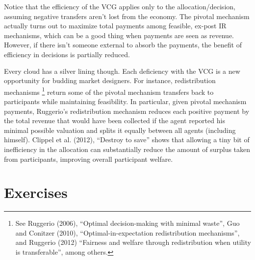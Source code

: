 \documentclass[letter, 10pt]{article}
\theoremstyle{basic}
\begin{document}
\begin{spacing}{1.0}
\hspace{1em}
Notice that the efficiency of the VCG applies only to the
allocation/decision, assuming negative transfers aren't lost from the
economy. The pivotal mechanism actually turns out to maximize total
payments among feasible, ex-post IR mechanisms, which can be a good thing when
payments are seen as revenue. However, if there isn't someone external to
absorb the payments, the benefit of efficiency in decisions is partially
reduced. 

\hspace{1em}
Every cloud has a silver lining though. Each deficiency with the VCG is a
new opportunity for budding market designers. For instance, redistribution
mechanisms \footnote{See Ruggerio (2006), ``Optimal decision-making with
  minimal waste'', Guo and Conitzer (2010), ``Optimal-in-expectation
  redistribution mechanisms'', and Ruggerio (2012) ``Fairness and welfare
  through redistribution when utility is transferable'', among others.}
return some of the pivotal mechanism transfers back to participants while
maintaining feasibility. In particular, given pivotal mechanism payments,
Ruggerio's redistribution mechanism reduces each positive payment by the
total revenue that would have been collected if the agent reported his
minimal possible valuation and splits it equally between all agents
(including himself).  Clippel et al. (2012), ``Destroy to save'' shows that
allowing a tiny bit of inefficiency in the allocation can substantially
reduce the amount of surplus taken from participants, improving overall
participant welfare.

\newpage
\section{Exercises}
\label{sec:exercises}


\end{spacing}
\end{document}
